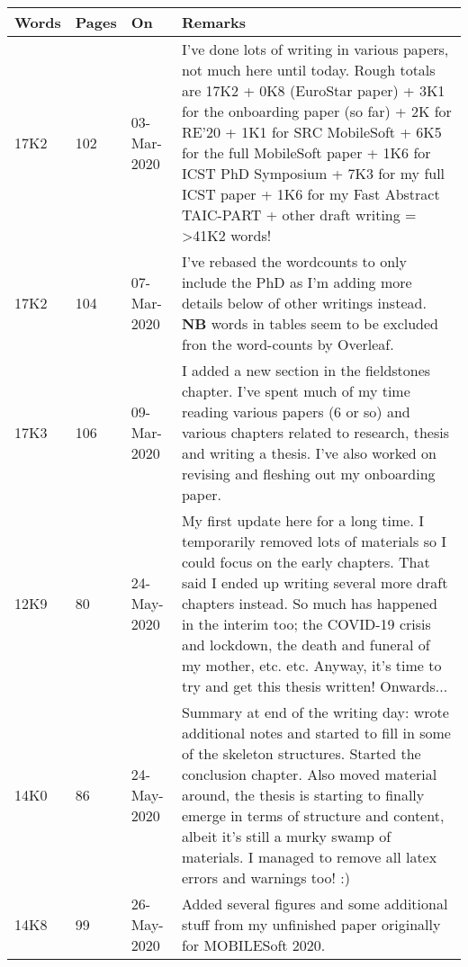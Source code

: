 \begin{table}[htpb]
    \begin{adjustbox}{width=\textwidth}
    \centering
    \footnotesize
    \begin{tabular}{p{}p{}p{}p{}}
     Words &Pages  &On &Remarks\\
         \hline
         17K2 &102 &03-Mar-2020 &I've done lots of writing in various papers, not much here until today. Rough totals are 17K2 + 0K8 (EuroStar paper) + 3K1 for the onboarding paper (so far) + 2K for RE'20 + 1K1 for SRC MobileSoft + 6K5 for the full MobileSoft paper + 1K6 for ICST PhD Symposium + 7K3 for my full ICST paper + 1K6 for my Fast Abstract TAIC-PART + other draft writing = >41K2 words!\\
         17K2 &104 &07-Mar-2020 &I've rebased the wordcounts to only include the PhD as I'm adding more details below of other writings instead. \textbf{NB} words in tables seem to be excluded fron the word-counts by Overleaf.\\
         17K3 &106 &09-Mar-2020 &I added a new section in the fieldstones chapter. I've spent much of my time reading various papers (6 or so) and various chapters related to research, thesis and writing a thesis. I've also worked on revising and fleshing out my onboarding paper.\\
         12K9 &80 &24-May-2020 &My first update here for a long time. I temporarily removed lots of materials so I could focus on the early chapters. That said I ended up writing several more draft chapters instead. So much has happened in the interim too; the COVID-19 crisis and lockdown, the death and funeral of my mother, etc. etc. Anyway, it's time to try and get this thesis written! Onwards...\\
         14K0 &86 &24-May-2020 &Summary at end of the writing day: wrote additional notes and started to fill in some of the skeleton structures. Started the conclusion chapter. Also moved material around, the thesis is starting to finally emerge in terms of structure and content, albeit it's still a murky swamp of materials. I managed to remove all latex errors and warnings too! :)\\
         14K8 &99 &26-May-2020 &Added several figures and some additional stuff from my unfinished paper originally for MOBILESoft 2020.\\

\end{tabular}
\end{adjustbox}
\end{table}
